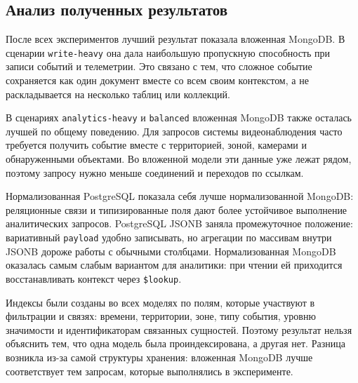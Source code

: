 \subsection{Анализ полученных результатов}

После всех экспериментов лучший результат показала вложенная MongoDB. В
сценарии \texttt{write-heavy} она дала наибольшую пропускную способность при
записи событий и телеметрии. Это связано с тем, что сложное событие
сохраняется как один документ вместе со всем своим контекстом,
а не раскладывается на несколько таблиц или коллекций.

В сценариях \texttt{analytics-heavy} и \texttt{balanced} вложенная MongoDB
также осталась лучшей по общему поведению. Для запросов системы
видеонаблюдения часто требуется получить событие вместе с территорией, зоной,
камерами и обнаруженными объектами. Во вложенной модели эти данные уже лежат
рядом, поэтому запросу нужно меньше соединений и переходов по ссылкам.

Нормализованная PostgreSQL показала себя лучше нормализованной MongoDB:
реляционные связи и типизированные поля дают более устойчивое выполнение
аналитических запросов. PostgreSQL JSONB заняла промежуточное положение:
вариативный \texttt{payload} удобно записывать, но агрегации по массивам
внутри JSONB дороже работы с обычными столбцами. Нормализованная MongoDB
оказалась самым слабым вариантом для аналитики: при чтении ей приходится
восстанавливать контекст через \texttt{\$lookup}.

Индексы были созданы во всех моделях по полям, которые участвуют в фильтрации
и связях: времени, территории, зоне, типу события, уровню значимости и
идентификаторам связанных сущностей. Поэтому результат нельзя объяснить тем,
что одна модель была проиндексирована, а другая нет. Разница возникла из-за
самой структуры хранения: вложенная MongoDB лучше соответствует тем запросам,
которые выполнялись в эксперименте.
